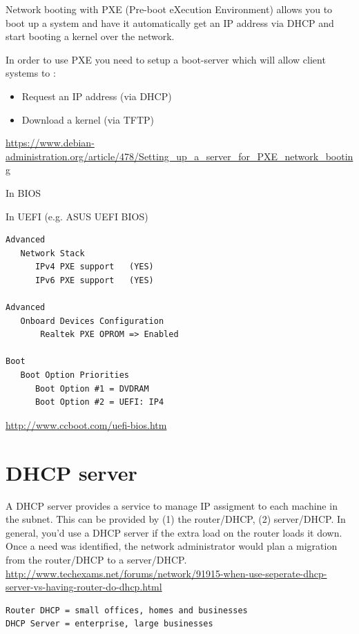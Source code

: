 Network booting with PXE (Pre-boot eXecution Environment) allows you to boot up
a system and have it automatically get an IP address via DHCP and start booting
a kernel over the network.

In order to use PXE you need to setup a boot-server which will allow client systems to :
\begin{itemize}
  \item  Request an IP address (via DHCP)
  \item  Download a kernel (via TFTP)
\end{itemize}
\url{https://www.debian-administration.org/article/478/Setting_up_a_server_for_PXE_network_booting}

In BIOS

In UEFI (e.g. ASUS UEFI BIOS)
\begin{verbatim}
Advanced
   Network Stack
      IPv4 PXE support   (YES)
      IPv6 PXE support   (YES)
      
Advanced
   Onboard Devices Configuration
       Realtek PXE OPROM => Enabled
       
Boot 
   Boot Option Priorities 
      Boot Option #1 = DVDRAM             
      Boot Option #2 = UEFI: IP4
\end{verbatim}
\url{http://www.ccboot.com/uefi-bios.htm}



\section{DHCP server}
\label{sec:DHCP}

A DHCP server provides a service to manage IP assigment to each machine in the
subnet. This can be provided by (1) the router/DHCP, (2) server/DHCP. In
general, you'd use a DHCP server if the extra load on the router loads it down.
Once a need was identified, the network administrator would plan a migration
from the router/DHCP to a server/DHCP.
\url{http://www.techexams.net/forums/network/91915-when-use-seperate-dhcp-server-vs-having-router-do-dhcp.html}
\begin{verbatim}
Router DHCP = small offices, homes and businesses
DHCP Server = enterprise, large businesses
\end{verbatim}

